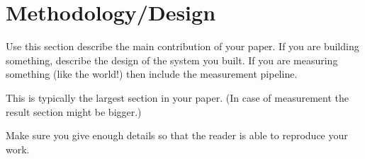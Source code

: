 \section{Methodology/Design}
\label{sec:methodology}

Use this section describe the main contribution of your paper. If you are
building something, describe the design of the system you built. If you are
measuring something (like the world!) then include the measurement pipeline.

This is typically the largest section in your paper. (In case of measurement the
result section might be bigger.)


Make sure you give enough details so that the reader is able to reproduce your
work.




